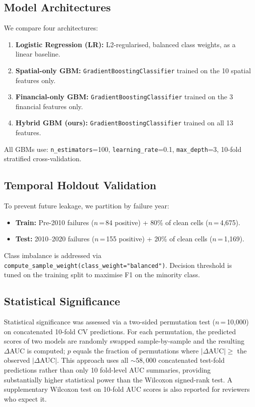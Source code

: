 \documentclass[conference]{IEEEtran}
\begin{document}
\subsection{Model Architectures}
We compare four architectures:
\begin{enumerate}
\item \textbf{Logistic Regression (LR):} L2-regularised, balanced
class weights, as a linear baseline.
\item \textbf{Spatial-only GBM:} \texttt{GradientBoostingClassifier}
trained on the 10 spatial features only.
\item \textbf{Financial-only GBM:} \texttt{GradientBoostingClassifier}
trained on the 3 financial features only.
\item \textbf{Hybrid GBM (ours):} \texttt{GradientBoostingClassifier}
trained on all 13 features.
\end{enumerate}
All GBMs use: \texttt{n\_estimators}=100, \texttt{learning\_rate}=0.1,
\texttt{max\_depth}=3, 10-fold stratified cross-validation.
\subsection{Temporal Holdout Validation}
To prevent future leakage, we partition by failure year:
\begin{itemize}
\item \textbf{Train:} Pre-2010 failures ($n$\,=\,84 positive) + 80\%
of clean cells ($n$\,=\,4,675).
\item \textbf{Test:} 2010–2020 failures ($n$\,=\,155 positive) + 20\%
of clean cells ($n$\,=\,1,169).
\end{itemize}
Class imbalance is addressed via
\texttt{compute\_sample\_weight(class\_weight="balanced")}. Decision
threshold is tuned on the training split to maximise F1 on the minority
class.
\subsection{Statistical Significance}
Statistical significance was assessed via a two-sided permutation test
($n$\,=\,10,000) on concatenated 10-fold CV predictions. For each
permutation, the predicted scores of two models are randomly swapped
sample-by-sample and the resulting $\Delta$AUC is computed; $p$ equals
the fraction of permutations where $|\Delta\text{AUC}| \geq$ the
observed $|\Delta\text{AUC}|$. This approach uses all ${\sim}58{,}000$
concatenated test-fold predictions rather than only 10 fold-level AUC
summaries, providing substantially higher statistical power than the
Wilcoxon signed-rank test. A supplementary Wilcoxon test on 10-fold AUC
scores is also reported for reviewers who expect it.
\end{document}
